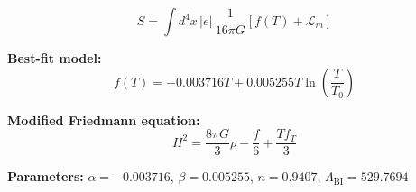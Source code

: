 
\begin{equation}
  S = \int d^4x \, |e| \, \frac{1}{16\pi G} \left[ f(T) + \mathcal{L}_m \right]
\end{equation}

\textbf{Best-fit model:}
\begin{equation}
  f(T) = -0.003716 T + 0.005255 T \ln\!\left(\frac{T}{T_0}\right)
\end{equation}

\textbf{Modified Friedmann equation:}
\begin{equation}
  H^2 = \frac{8\pi G}{3} \rho - \frac{f}{6} + \frac{T f_T}{3}
\end{equation}

\textbf{Parameters:}
$\alpha = -0.003716$, \quad
$\beta = 0.005255$, \quad
$n = 0.9407$, \quad
$\Lambda_{\text{BI}} = 529.7694$